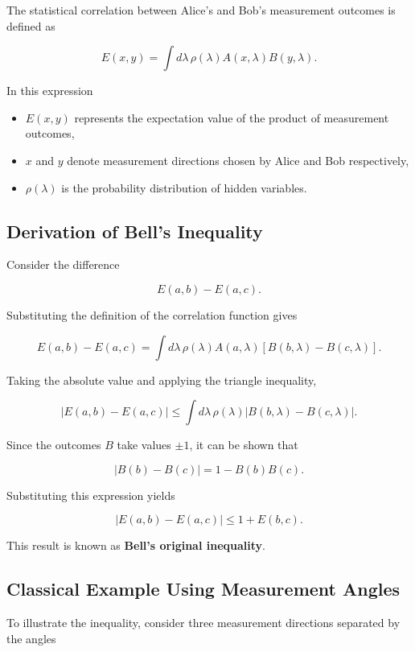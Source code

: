 \documentclass[14pt,a4paper]{extarticle}
\begin{document}
The statistical correlation between Alice’s and Bob’s measurement outcomes is defined as

\[
E(x,y) =
\int d\lambda \, \rho(\lambda) A(x,\lambda) B(y,\lambda).
\]

In this expression

\begin{itemize}
\item $E(x,y)$ represents the expectation value of the product of measurement outcomes,
\item $x$ and $y$ denote measurement directions chosen by Alice and Bob respectively,
\item $\rho(\lambda)$ is the probability distribution of hidden variables.
\end{itemize}


\subsection{Derivation of Bell's Inequality}

Consider the difference

\[
E(a,b) - E(a,c).
\]

Substituting the definition of the correlation function gives

\[
E(a,b) - E(a,c)
=
\int d\lambda \, \rho(\lambda)
A(a,\lambda)
\left[
B(b,\lambda) - B(c,\lambda)
\right].
\]

Taking the absolute value and applying the triangle inequality,

\[
|E(a,b) - E(a,c)|
\le
\int d\lambda \, \rho(\lambda)
|B(b,\lambda) - B(c,\lambda)|.
\]

Since the outcomes $B$ take values $\pm1$, it can be shown that

\[
|B(b) - B(c)| = 1 - B(b)B(c).
\]

Substituting this expression yields

\[
|E(a,b) - E(a,c)| \le 1 + E(b,c).
\]

This result is known as \textbf{Bell’s original inequality}.


\subsection{Classical Example Using Measurement Angles}

To illustrate the inequality, consider three measurement directions separated by the angles
\end{document}
